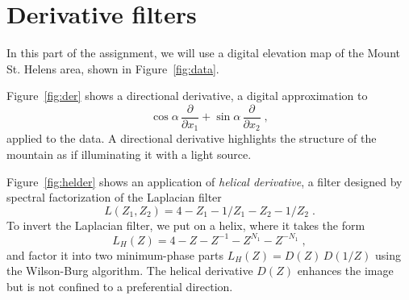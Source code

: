 \lstset{language=python,numbers=left,numberstyle=\tiny,showstringspaces=false}


\section{Derivative filters}

In this part of the assignment, we will use a digital elevation map
of the Mount St. Helens area, shown in
Figure~\ref{fig:data}.


Figure~\ref{fig:der} shows a directional derivative, a digital approximation to
\begin{equation}
\label{eq:der}
\cos{\alpha}\,\frac{\partial}{\partial x_1} + \sin{\alpha}\,\frac{\partial}{\partial x_2}\;,
\end{equation}
applied to the data. A directional derivative highlights the structure
of the mountain as if illuminating it with a light source.


Figure~\ref{fig:helder} shows an application of \emph{helical
derivative}, a filter designed by spectral factorization of the
Laplacian filter
\begin{equation}
\label{eq:lap4}
L(Z_1,Z_2) = 4 - Z_1 - 1/Z_1 - Z_2 - 1/Z_2\;.
\end{equation}
To invert the Laplacian filter, we put on a helix, where it takes
the form
\begin{equation}
\label{eq:lap1}
L_H(Z) = 4 - Z - Z^{-1} - Z^{N_1} - Z^{-N_1}\;,
\end{equation} 
and factor it into two minimum-phase parts $L_H(Z) = D(Z)\,D(1/Z)$
using the Wilson-Burg algorithm. The helical derivative $D(Z)$
enhances the image but is not confined to a preferential direction.


